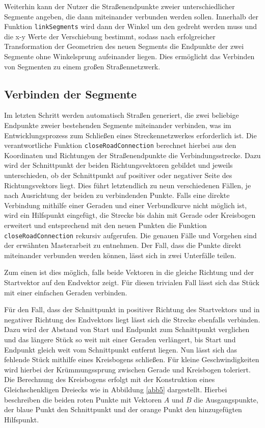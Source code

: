 Weiterhin kann der Nutzer die Straßenendpunkte zweier unterschiedlicher Segmente angeben, die dann miteinander verbunden werden sollen. Innerhalb der Funktion \texttt{linkSegments} wird dann der Winkel um den gedreht werden muss und die x-y Werte der Verschiebung bestimmt, sodass nach erfolgreicher Transformation der Geometrien des neuen Segments die Endpunkte der zwei Segmente ohne Winkelsprung aufeinander liegen. Dies ermöglicht das Verbinden von Segmenten zu einem großen Straßennetzwerk.

\subsection{Verbinden der Segmente}
Im letzten Schritt werden automatisch Straßen generiert, die zwei beliebige Endpunkte zweier bestehenden Segmente miteinander verbinden, was im Entwicklungsprozess zum Schließen eines Streckennetzwerkes erforderlich ist. Die verantwortliche Funktion \texttt{closeRoadConnection} berechnet hierbei aus den Koordinaten und Richtungen der Straßenendpunkte die Verbindungsstrecke. Dazu wird der Schnittpunkt der beiden Richtungsvektoren gebildet und jeweils unterschieden, ob der Schnittpunkt auf positiver oder negativer Seite des Richtungsvektors liegt. Dies führt letztendlich zu neun verschiedenen Fällen, je nach Ausrichtung der beiden zu verbindenden Punkte. Falls eine direkte Verbindung mithilfe einer Geraden und einer Verbundkurve nicht möglich ist, wird ein Hilfspunkt eingefügt, die Strecke bis dahin mit Gerade oder Kreisbogen erweitert und entsprechend mit den neuen Punkten die Funktion \texttt{closeRoadConnection} rekursiv aufgerufen. Die genauen Fälle und Vorgehen sind der erwähnten Masterarbeit zu entnehmen.\cite{Russ.2019} Der Fall, dass die Punkte direkt miteinander verbunden werden können, lässt sich in zwei Unterfälle teilen.

Zum einen ist dies möglich, falls beide Vektoren in die gleiche Richtung und der Startvektor auf den Endvektor zeigt. Für diesen trivialen Fall lässt sich das Stück mit einer einfachen Geraden verbinden.

Für den Fall, dass der Schnittpunkt in positiver Richtung des Startvektors und in negativer Richtung des Endvektors liegt lässt sich die Strecke ebenfalls verbinden. Dazu wird der Abstand von Start und Endpunkt zum Schnittpunkt verglichen und das längere Stück so weit mit einer Geraden verlängert, bis Start und Endpunkt gleich weit vom Schnittpunkt entfernt liegen. Nun lässt sich das fehlende Stück mithilfe eines Kreisbogens schließen. Für kleine Geschwindigkeiten wird hierbei der Krümmungssprung zwischen Gerade und Kreisbogen toleriert. Die Berechnung des Kreisbogens erfolgt mit der Konstruktion eines Gleichschenkligen Dreiecks wie in Abbildung \ref{abb5} dargestellt. Hierbei beschreiben die beiden roten Punkte mit Vektoren \(A\) und \(B\) die Ausgangspunkte, der blaue Punkt den Schnittpunkt und der orange Punkt den hinzugefügten Hilfspunkt.

